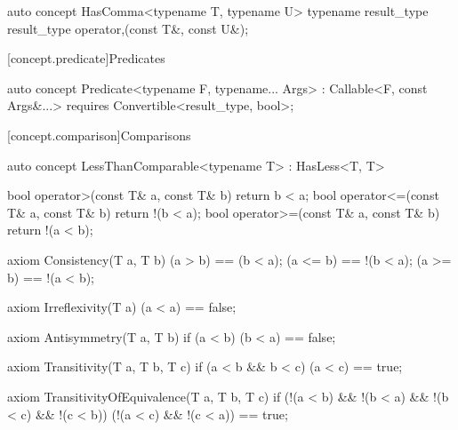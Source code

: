 \documentclass[american,twoside]{book}
\begin{document}
\begin{itemdecl}
auto concept HasComma<typename T, typename U> {
  typename result_type
  result_type operator,(const T&, const U&);
}
\end{itemdecl}

\begin{itemdescr}
\pnum
{}
\end{itemdescr}

[concept.predicate]{Predicates}

\begin{itemdecl}
auto concept Predicate<typename F, typename... Args> : Callable<F, const Args&...> {
  requires Convertible<result_type, bool>;
}
\end{itemdecl}

\begin{itemdescr}
\pnum
{}

\pnum
{}
\end{itemdescr}

[concept.comparison]{Comparisons}
\begin{itemdecl}
auto concept LessThanComparable<typename T> : HasLess<T, T> {
  bool operator>(const T& a, const T& b) { return b < a; }
  bool operator<=(const T& a, const T& b) { return !(b < a); }
  bool operator>=(const T& a, const T& b) { return !(a < b); }

  axiom Consistency(T a, T b) {
    (a > b) == (b < a);
    (a <= b) == !(b < a);
    (a >= b) == !(a < b);
  }

  axiom Irreflexivity(T a) { (a < a) == false; }

  axiom Antisymmetry(T a, T b) { 
    if (a < b) 
      (b < a) == false;
  }

  axiom Transitivity(T a, T b, T c) {
    if (a < b && b < c) 
      (a < c) == true;
  }

  axiom TransitivityOfEquivalence(T a, T b, T c) {
    if (!(a < b) && !(b < a) && !(b < c) && !(c < b))
      (!(a < c) && !(c < a)) == true;
  } 
}
\end{itemdecl}

\begin{itemdescr}
\pnum 
{}
\end{itemdescr}
\end{document}
